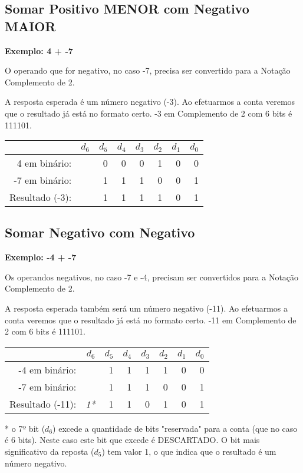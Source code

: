 \subsection{Somar Positivo MENOR com Negativo MAIOR}

\noindent\textbf{Exemplo: 4 + -7}

O operando que for negativo, no caso -7, precisa ser convertido para a Notação Complemento de 2. 

A resposta esperada é um número negativo (-3). Ao efetuarmos a conta veremos que o resultado já está no formato certo. -3 em Complemento de 2 com 6 bits é 111101.

\begin{table}[h]
	\centering
	\begin{tabular}{|r|r|r|r|r|r|r|r|}
		\hline			& $d_6$ & $d_5$ & $d_4$ & $d_3$  & $d_2$ & $d_1$ & $d_0$ \\
		\hline
		4 em binário: 	&	& 0 & 0 & 0  & 1 & 0 & 0 \\
		\hline
		-7 em binário:	&	& 1 & 1 & 1  & 0 & 0 & 1 \\
		\hline
		\hline
		Resultado (-3):	&   & 1	& 1 & 1  & 1 & 0 & 1 \\
		\hline
	\end{tabular}
\end{table}


\subsection{Somar Negativo com Negativo}

\noindent\textbf{Exemplo: -4 + -7}

Os operandos negativos, no caso -7 e -4, precisam ser convertidos para a Notação Complemento de 2. 

A resposta esperada também será um número negativo (-11). Ao efetuarmos a conta veremos que o resultado já está no formato certo. -11 em Complemento de 2 com 6 bits é 111101.

\begin{table}[h]
	\centering
	\begin{tabular}{|r|r|r|r|r|r|r|r|}
		\hline			& $d_6$ & $d_5$ & $d_4$ & $d_3$  & $d_2$ & $d_1$ & $d_0$ \\
		\hline
		-4 em binário: 	&	& 1 & 1 & 1  & 1 & 0 & 0 \\
		\hline
		-7 em binário:	&	& 1 & 1 & 1  & 0 & 0 & 1 \\
		\hline
		\hline
		Resultado (-11):	&\emph{1*} 	& 1 & 1 & 0  & 1 & 0 & 1 \\
		\hline
	\end{tabular}
\end{table}
* o 7º bit ($d_6$) excede a quantidade de bits "reservada" para a conta (que no caso é 6 bits). Neste caso este bit que excede é DESCARTADO. O bit mais significativo da reposta ($d_5$) tem valor 1, o que indica que o resultado é um número negativo.
